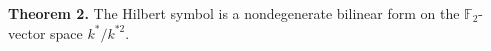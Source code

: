 \textbf{Theorem 2.} The Hilbert symbol is a nondegenerate bilinear form on the $\mathbb{F}_2$-vector space $k^*/k^{*2}$.
